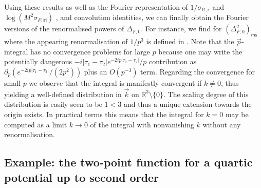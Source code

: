 \documentclass[10pt]{book}
\newcommand{\ms}{\mathsf{ms}}
\theoremstyle{break}
\begin{document}
Using these results as well as the Fourier representation of $1/\sigma_{\mathbb{M},\epsilon}$ %
and $\log \left(M^2\sigma_{F,\mathbb{M}}\right)$
, and convolution identities, we can finally obtain the Fourier versions of the renormalised powers of $\Delta_{F,0}$. For instance, we find for $\left(\Delta^2_{F,0}\right)_\ms$
%
%
where the appearing renormalisation of $1/p^3$ is defined in %
. Note that the $\vec{p}$-integral has no convergence problems for large $p$ because one may write the potentially dangerous $-i|\tau_1-\tau_2|e^{-2ip|\tau_1-\tau_2|}/p$ contribution as $\partial_p( e^{-2ip|\tau_1-\tau_2|}/(2p^2))$ plus an $O(p^{-3})$ term. Regarding the convergence for small $p$ we observe that the integral is manifestly convergent if $k\neq0$, thus yielding a well-defined distribution in $\vec{k}$ on $\mathbb{R}^3\setminus\{0\}$. The scaling degree of this distribution is easily seen to be $1<3$ and thus a unique extension towards the origin exists. In practical terms this means that the integral for $k=0$ may be computed as a limit $k\to0$ of the integral with nonvanishing $k$ without any renormalisation. 


\subsection{Example: the two-point function for a quartic potential up to second order}
\end{document}
